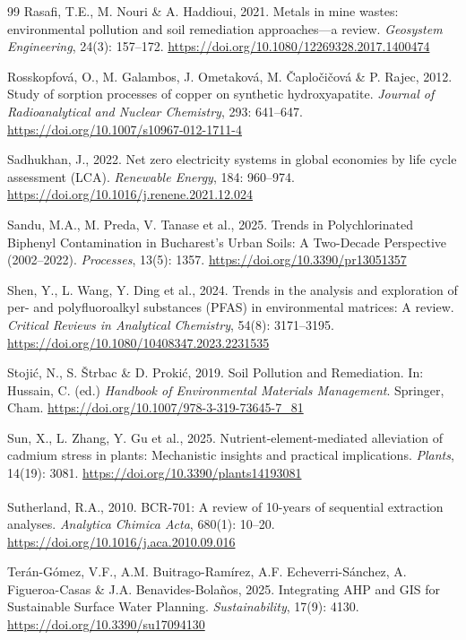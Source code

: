 \documentclass[sn-mathphys-num]{sn-jnl}
\begin{document}
\begin{thebibliography}{99}
Rasafi, T.E., M. Nouri \& A. Haddioui, 2021.
Metals in mine wastes: environmental pollution and soil remediation
approaches---a review.
\textit{Geosystem Engineering}, 24(3): 157--172.
\url{https://doi.org/10.1080/12269328.2017.1400474}

Rosskopfov\'{a}, O., M. Galambos, J. Ometakov\'{a}, M. \v{C}aplo\v{c}i\v{c}ov\'{a}
\& P. Rajec, 2012.
Study of sorption processes of copper on synthetic hydroxyapatite.
\textit{Journal of Radioanalytical and Nuclear Chemistry}, 293: 641--647.
\url{https://doi.org/10.1007/s10967-012-1711-4}

Sadhukhan, J., 2022.
Net zero electricity systems in global economies by life cycle assessment
(LCA).
\textit{Renewable Energy}, 184: 960--974.
\url{https://doi.org/10.1016/j.renene.2021.12.024}

Sandu, M.A., M. Preda, V. Tanase et al., 2025.
Trends in Polychlorinated Biphenyl Contamination in Bucharest's Urban Soils:
A Two-Decade Perspective (2002--2022).
\textit{Processes}, 13(5): 1357.
\url{https://doi.org/10.3390/pr13051357}

Shen, Y., L. Wang, Y. Ding et al., 2024.
Trends in the analysis and exploration of per- and polyfluoroalkyl substances
(PFAS) in environmental matrices: A review.
\textit{Critical Reviews in Analytical Chemistry}, 54(8): 3171--3195.
\url{https://doi.org/10.1080/10408347.2023.2231535}

Stoji\'{c}, N., S. \v{S}trbac \& D. Proki\'{c}, 2019.
Soil Pollution and Remediation.
In: Hussain, C. (ed.) \textit{Handbook of Environmental Materials
Management}. Springer, Cham.
\url{https://doi.org/10.1007/978-3-319-73645-7_81}

Sun, X., L. Zhang, Y. Gu et al., 2025.
Nutrient-element-mediated alleviation of cadmium stress in plants:
Mechanistic insights and practical implications.
\textit{Plants}, 14(19): 3081.
\url{https://doi.org/10.3390/plants14193081}

Sutherland, R.A., 2010.
BCR\textsuperscript{\textregistered}-701: A review of 10-years of sequential
extraction analyses.
\textit{Analytica Chimica Acta}, 680(1): 10--20.
\url{https://doi.org/10.1016/j.aca.2010.09.016}

Ter\'{a}n-G\'{o}mez, V.F., A.M. Buitrago-Ram\'{i}rez, A.F. Echeverri-S\'{a}nchez,
A. Figueroa-Casas \& J.A. Benavides-Bola\~{n}os, 2025.
Integrating AHP and GIS for Sustainable Surface Water Planning.
\textit{Sustainability}, 17(9): 4130.
\url{https://doi.org/10.3390/su17094130}


\end{thebibliography}
\end{document}
